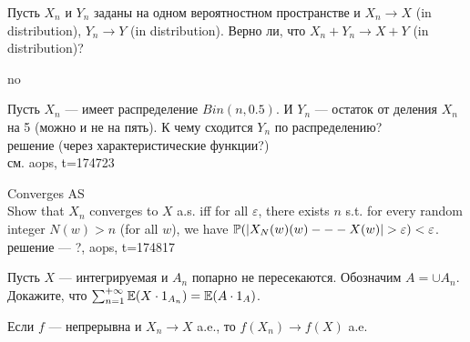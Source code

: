 \begin{problem}
Пусть $X_{n}$ и $Y_{n}$ заданы на одном вероятностном пространстве
и $X_{n}\rightarrow X$ (in distribution), $Y_{n}\rightarrow Y$ (in
distribution). Верно ли, что $X_{n}+Y_{n}\rightarrow X+Y$ (in
distribution)? 
\end{problem} 
\begin{solution} 
no
\end{solution}

\begin{problem}
Пусть $X_{n}$ --- имеет распределение $Bin(n,0.5)$. И $Y_{n}$ --- остаток от деления $X_{n}$ на 5 (можно и не на пять). К чему сходится $Y_{n}$ по распределению? \\
решение (через характеристические функции?) \\
см. aops, t=174723 
\end{problem} 
\begin{solution} 

\end{solution}

\begin{problem}
Converges AS\\
Show that $X_{n}$ converges to $X$ a.s. iff for all $\varepsilon$, there exists $n$ s.t. for every random integer $N(w)>n$ (for all $w$), we have $\P(|X_N(w) (w) --- X (w)| > \varepsilon) <\varepsilon$.\\
решение --- ?, aops, t=174817 
\end{problem} 
\begin{solution} 

\end{solution}

\begin{problem}
Пусть $X$ --- интегрируемая и $A_{n}$ попарно не пересекаются.
Обозначим $A=\cup A_{n}$. Докажите, что
$\sum_{n=1}^{+\infty}\E(X\cdot 1_{A_{n}})=\E(A\cdot 1_{A})$. 
\end{problem} 
\begin{solution} 

\end{solution}

\begin{problem}
Если $f$ --- непрерывна и $X_{n}\rightarrow X$ a.e., то
$f(X_{n})\rightarrow f(X)$ a.e.
\end{problem} 
\begin{solution} 

\end{solution}

